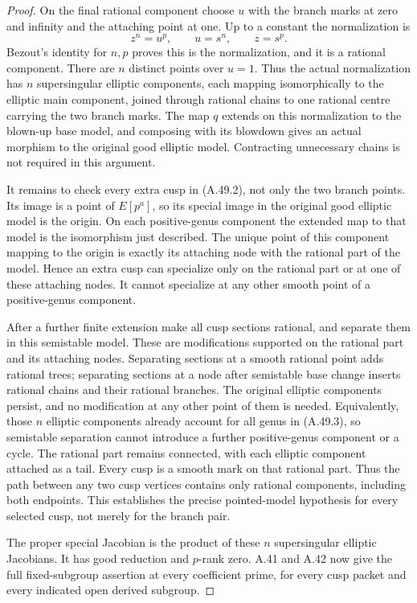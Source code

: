 \begin{proof}
On the final rational component choose \(u\) with
the branch marks at zero and infinity and the
attaching point at one. Up to a constant the
normalization is
\[
                  z^n=u^p,\qquad u=s^n,
                  \qquad z=s^p.                   \tag{A.49.5}
\]
Bezout's identity for \(n,p\) proves this is the
normalization, and it is a rational component.
There are \(n\) distinct points over \(u=1\).
Thus the actual normalization has \(n\)
supersingular elliptic components, each mapping
isomorphically to the elliptic main component,
joined through rational chains to one rational
centre carrying the two branch marks. The map
\(q\) extends on this normalization to the
blown-up base model, and composing with its
blowdown gives an actual morphism to the original
good elliptic model. Contracting unnecessary chains
is not required in this argument.

It remains to check every extra cusp in (A.49.2),
not only the two branch points. Its image is a
point of \(E[p^a]\), so its special image in
the original good elliptic model is the origin.
On each positive-genus component the extended
map to that model is the isomorphism just described.
The unique point of this component mapping to the
origin is exactly its attaching node with the
rational part of the model. Hence an extra cusp
can specialize only on the rational part or at
one of these attaching nodes. It cannot specialize
at any other smooth point of a positive-genus
component.

After a further finite extension make all cusp
sections rational, and separate them in this
semistable model. These are modifications supported
on the rational part and its attaching nodes.
Separating sections at a smooth rational point
adds rational trees; separating sections at a node
after semistable base change inserts rational chains
and their rational branches. The original elliptic
components persist, and no modification at any other
point of them is needed. Equivalently, those \(n\)
elliptic components already account for all genus
in (A.49.3), so semistable separation cannot introduce
a further positive-genus component or a cycle.
The rational part remains connected, with each
elliptic component attached as a tail. Every cusp
is a smooth mark on that rational part. Thus the
path between any two cusp vertices contains only
rational components, including both endpoints.
This establishes the precise pointed-model hypothesis
for every selected cusp, not merely for the branch
pair.

The proper special Jacobian is the product of these
\(n\) supersingular elliptic Jacobians. It has
good reduction and \(p\)-rank zero. A.41 and
A.42 now give the full fixed-subgroup assertion at
every coefficient prime, for every cusp packet and
every indicated open derived subgroup.


\end{proof}
